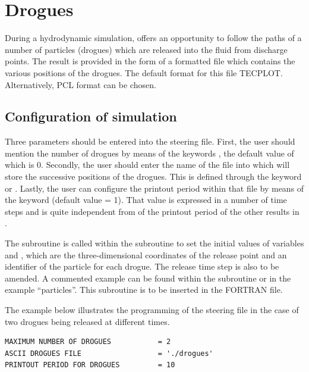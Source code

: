 \chapter{Drogues}
\label{sec:drogues}

During a hydrodynamic simulation,  offers an opportunity to follow the paths of a number of particles (drogues) which are released into the fluid from discharge points. The result is provided in the form of a formatted file which contains the various positions of the drogues. The default format for this file TECPLOT. Alternatively, PCL format can be chosen.

\section{Configuration of simulation}

Three parameters should be entered into the steering file. First, the user should mention the number of drogues by means of the keywords , the default value of which is 0. Secondly, the user should enter the name of the file into which  will store the successive positions of the drogues. This is defined through the keyword  or .  Lastly, the user can configure the printout period within that file by means of the keyword  (default value = 1). That value is expressed in a number of time steps and is quite independent from of the printout period of the other results in .

The subroutine  is called within the  subroutine to set the initial values of variables  and , which are the three-dimensional coordinates of the release point and an identifier of the particle for each drogue. The release time step is also to be amended. A commented example can be found within the subroutine  or in the example ``particles''. This subroutine is to be inserted in the FORTRAN file.

The example below illustrates the programming of the steering file in the case
of two drogues being released at different times.

\begin{lstlisting}[language=TelemacCas]
MAXIMUM NUMBER OF DROGUES           = 2
ASCII DROGUES FILE                  = './drogues'
PRINTOUT PERIOD FOR DROGUES         = 10
\end{lstlisting}

